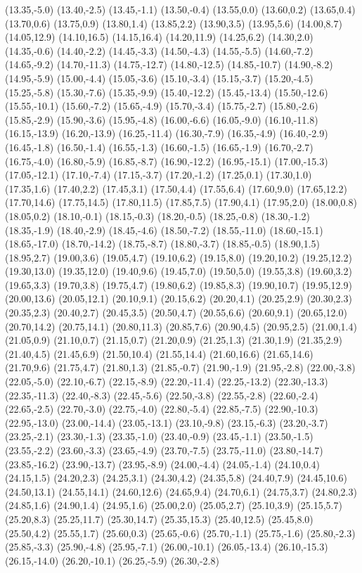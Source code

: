 (13.35,-5.0) (13.40,-2.5) (13.45,-1.1) (13.50,-0.4) (13.55,0.0) (13.60,0.2) (13.65,0.4) (13.70,0.6) (13.75,0.9) (13.80,1.4) (13.85,2.2) (13.90,3.5) (13.95,5.6) (14.00,8.7) (14.05,12.9) (14.10,16.5) (14.15,16.4) (14.20,11.9) (14.25,6.2) (14.30,2.0) (14.35,-0.6) (14.40,-2.2) (14.45,-3.3) (14.50,-4.3) (14.55,-5.5) (14.60,-7.2) (14.65,-9.2) (14.70,-11.3) (14.75,-12.7) (14.80,-12.5) (14.85,-10.7) (14.90,-8.2) (14.95,-5.9) (15.00,-4.4) (15.05,-3.6) (15.10,-3.4) (15.15,-3.7) (15.20,-4.5) (15.25,-5.8) (15.30,-7.6) (15.35,-9.9) (15.40,-12.2) (15.45,-13.4) (15.50,-12.6) (15.55,-10.1) (15.60,-7.2) (15.65,-4.9) (15.70,-3.4) (15.75,-2.7) (15.80,-2.6) (15.85,-2.9) (15.90,-3.6) (15.95,-4.8) (16.00,-6.6) (16.05,-9.0) (16.10,-11.8) (16.15,-13.9) (16.20,-13.9) (16.25,-11.4) (16.30,-7.9) (16.35,-4.9) (16.40,-2.9) (16.45,-1.8) (16.50,-1.4) (16.55,-1.3) (16.60,-1.5) (16.65,-1.9) (16.70,-2.7) (16.75,-4.0) (16.80,-5.9) (16.85,-8.7) (16.90,-12.2) (16.95,-15.1) (17.00,-15.3) (17.05,-12.1) (17.10,-7.4) (17.15,-3.7) (17.20,-1.2) (17.25,0.1) (17.30,1.0) (17.35,1.6) (17.40,2.2) (17.45,3.1) (17.50,4.4) (17.55,6.4) (17.60,9.0) (17.65,12.2) (17.70,14.6) (17.75,14.5) (17.80,11.5) (17.85,7.5) (17.90,4.1) (17.95,2.0) (18.00,0.8) (18.05,0.2) (18.10,-0.1) (18.15,-0.3) (18.20,-0.5) (18.25,-0.8) (18.30,-1.2) (18.35,-1.9) (18.40,-2.9) (18.45,-4.6) (18.50,-7.2) (18.55,-11.0) (18.60,-15.1) (18.65,-17.0) (18.70,-14.2) (18.75,-8.7) (18.80,-3.7) (18.85,-0.5) (18.90,1.5) (18.95,2.7) (19.00,3.6) (19.05,4.7) (19.10,6.2) (19.15,8.0) (19.20,10.2) (19.25,12.2) (19.30,13.0) (19.35,12.0) (19.40,9.6) (19.45,7.0) (19.50,5.0) (19.55,3.8) (19.60,3.2) (19.65,3.3) (19.70,3.8) (19.75,4.7) (19.80,6.2) (19.85,8.3) (19.90,10.7) (19.95,12.9) (20.00,13.6) (20.05,12.1) (20.10,9.1) (20.15,6.2) (20.20,4.1) (20.25,2.9) (20.30,2.3) (20.35,2.3) (20.40,2.7) (20.45,3.5) (20.50,4.7) (20.55,6.6) (20.60,9.1) (20.65,12.0) (20.70,14.2) (20.75,14.1) (20.80,11.3) (20.85,7.6) (20.90,4.5) (20.95,2.5) (21.00,1.4) (21.05,0.9) (21.10,0.7) (21.15,0.7) (21.20,0.9) (21.25,1.3) (21.30,1.9) (21.35,2.9) (21.40,4.5) (21.45,6.9) (21.50,10.4) (21.55,14.4) (21.60,16.6) (21.65,14.6) (21.70,9.6) (21.75,4.7) (21.80,1.3) (21.85,-0.7) (21.90,-1.9) (21.95,-2.8) (22.00,-3.8) (22.05,-5.0) (22.10,-6.7) (22.15,-8.9) (22.20,-11.4) (22.25,-13.2) (22.30,-13.3) (22.35,-11.3) (22.40,-8.3) (22.45,-5.6) (22.50,-3.8) (22.55,-2.8) (22.60,-2.4) (22.65,-2.5) (22.70,-3.0) (22.75,-4.0) (22.80,-5.4) (22.85,-7.5) (22.90,-10.3) (22.95,-13.0) (23.00,-14.4) (23.05,-13.1) (23.10,-9.8) (23.15,-6.3) (23.20,-3.7) (23.25,-2.1) (23.30,-1.3) (23.35,-1.0) (23.40,-0.9) (23.45,-1.1) (23.50,-1.5) (23.55,-2.2) (23.60,-3.3) (23.65,-4.9) (23.70,-7.5) (23.75,-11.0) (23.80,-14.7) (23.85,-16.2) (23.90,-13.7) (23.95,-8.9) (24.00,-4.4) (24.05,-1.4) (24.10,0.4) (24.15,1.5) (24.20,2.3) (24.25,3.1) (24.30,4.2) (24.35,5.8) (24.40,7.9) (24.45,10.6) (24.50,13.1) (24.55,14.1) (24.60,12.6) (24.65,9.4) (24.70,6.1) (24.75,3.7) (24.80,2.3) (24.85,1.6) (24.90,1.4) (24.95,1.6) (25.00,2.0) (25.05,2.7) (25.10,3.9) (25.15,5.7) (25.20,8.3) (25.25,11.7) (25.30,14.7) (25.35,15.3) (25.40,12.5) (25.45,8.0) (25.50,4.2) (25.55,1.7) (25.60,0.3) (25.65,-0.6) (25.70,-1.1) (25.75,-1.6) (25.80,-2.3) (25.85,-3.3) (25.90,-4.8) (25.95,-7.1) (26.00,-10.1) (26.05,-13.4) (26.10,-15.3) (26.15,-14.0) (26.20,-10.1) (26.25,-5.9) (26.30,-2.8) 